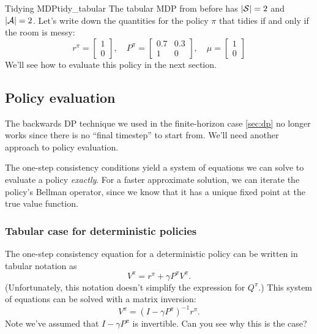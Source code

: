 \documentclass[\main/main]{subfiles}
\begin{document}
\begin{example}{Tidying MDP}{tidy_tabular}
    The tabular MDP from before has $|\S| = 2$ and $|\A| = 2$. Let's write down the quantities for the policy $\pi$ that tidies if and only if the room is messy:
    \[
        r^{\pi} = \begin{bmatrix} 1 \\ 0 \end{bmatrix}, \quad
        P^{\pi} = \begin{bmatrix} 0.7 & 0.3 \\ 1 & 0 \end{bmatrix}, \quad
        \mu = \begin{bmatrix} 1 \\ 0 \end{bmatrix}
    \]
    We'll see how to evaluate this policy in the next section.
\end{example}

\subsection{Policy evaluation}

The backwards DP technique we used in the finite-horizon case \eqref{sec:dp} no longer works since there is no ``final timestep'' to start from. We'll need another approach to policy evaluation.

The one-step consistency conditions yield a system of equations we can solve to evaluate a policy \emph{exactly}. For a faster approximate solution, we can iterate the policy's Bellman operator, since we know that it has a unique fixed point at the true value function.


\subsubsection{Tabular case for deterministic policies}

The one-step consistency equation for a deterministic policy can be written in tabular notation as
\[
    V^\pi = r^\pi + \gamma P^\pi V^\pi.
\]
(Unfortunately, this notation doesn't simplify the expression for $Q^\pi$.) This system of equations can be solved with a matrix inversion:
\begin{equation}
    V^\pi = (I - \gamma P^\pi)^{-1} r^\pi. \label{eq:matrix_inversion_pe}
\end{equation}
Note we've assumed that $I - \gamma P^\pi$ is invertible. Can you see why this is the case?
\end{document}
